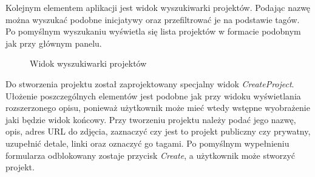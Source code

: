 \bigskip
\bigskip
\bigskip
\bigskip
\bigskip
\bigskip
\bigskip
\bigskip
\bigskip
\bigskip
\bigskip
\bigskip
\bigskip
\bigskip
\bigskip
\bigskip

Kolejnym elementem aplikacji jest widok wyszukiwarki projektów. Podając nazwę można wyszukać podobne inicjatywy oraz przefiltrować je na podstawie tagów. Po pomyślnym wyszukaniu wyświetla się lista projektów w formacie podobnym jak przy głównym panelu.



\begin{figure}[h!]
	\caption{Widok wyszukiwarki projektów}
	\centering
\end{figure}



Do stworzenia projektu został zaprojektowany specjalny widok \textit{CreateProject}. Ułożenie poszczególnych elementów jest podobne jak przy widoku wyświetlania rozszerzonego opisu, ponieważ użytkownik może mieć wtedy wstępne wyobrażenie jaki będzie widok końcowy. Przy tworzeniu projektu należy podać jego nazwę, opis, adres URL do zdjęcia, zaznaczyć czy jest to projekt publiczny czy prywatny, uzupełnić detale, linki oraz oznaczyć go tagami. Po pomyślnym wypełnieniu formularza odblokowany zostaje przycisk \textit{Create}, a użytkownik może stworzyć projekt.


